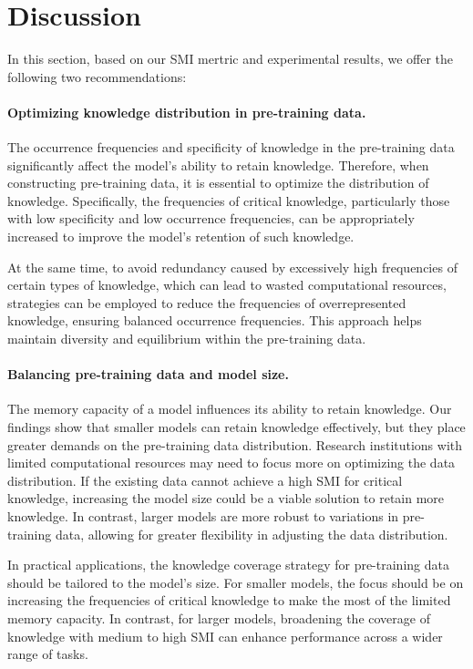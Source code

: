 \section{Discussion}
\label{discussion}

In this section, based on our SMI mertric and experimental results, we offer the following two recommendations:

\paragraph{Optimizing knowledge distribution in pre-training data.}
The occurrence frequencies and specificity of knowledge in the pre-training data significantly affect the model's ability to retain knowledge. Therefore, when constructing pre-training data, it is essential to optimize the distribution of knowledge. Specifically, the frequencies of critical knowledge, particularly those with low specificity and low occurrence frequencies, can be appropriately increased to improve the model's retention of such knowledge.

At the same time, to avoid redundancy caused by excessively high frequencies of certain types of knowledge, which can lead to wasted computational resources, strategies can be employed to reduce the frequencies of overrepresented knowledge, ensuring balanced occurrence frequencies. This approach helps maintain diversity and equilibrium within the pre-training data.

\paragraph{Balancing pre-training data and model size.}
The memory capacity of a model influences its ability to retain knowledge. Our findings show that smaller models can retain knowledge effectively, but they place greater demands on the pre-training data distribution. Research institutions with limited computational resources may need to focus more on optimizing the data distribution. If the existing data cannot achieve a high SMI for critical knowledge, increasing the model size could be a viable solution to retain more knowledge. In contrast, larger models are more robust to variations in pre-training data, allowing for greater flexibility in adjusting the data distribution.

In practical applications, the knowledge coverage strategy for pre-training data should be tailored to the model’s size. For smaller models, the focus should be on increasing the frequencies of critical knowledge to make the most of the limited memory capacity. In contrast, for larger models, broadening the coverage of knowledge with medium to high SMI can enhance performance across a wider range of tasks.

